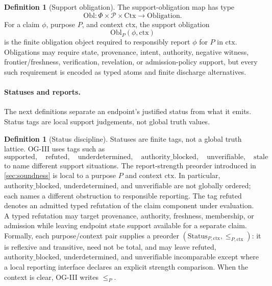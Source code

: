 \documentclass[11pt,twoside]{article}
\theoremstyle{definition}
\newtheorem{definition}[theorem]{Definition}
\newcommand{\Obl}{\mathrm{Obl}}
\newcommand{\Obligation}{\mathrm{Obligation}}
\newcommand{\ctx}{\mathrm{ctx}}
\newcommand{\stale}{\mathrm{stale}}
\newcommand{\supported}{\mathrm{supported}}
\newcommand{\refuted}{\mathrm{refuted}}
\newcommand{\underdetermined}{\mathrm{underdetermined}}
\newcommand{\authorityblocked}{\mathrm{authority\_blocked}}
\newcommand{\unverifiable}{\mathrm{unverifiable}}
\begin{document}
\begin{definition}[Support obligation]
The support-obligation map has type
\[
  \Obl:\Phi\times\mathcal P\times\mathrm{Ctx}\to\Obligation.
\]
For a claim $\phi$, purpose $P$, and context $\ctx$, the support obligation
\[
  \Obl_P(\phi,\ctx)
\]
is the finite obligation object required to responsibly report $\phi$ for $P$
in $\ctx$. Obligations may require state, provenance, intent, authority,
negative witness, frontier/freshness, verification, revelation, or
admission-policy support, but every such requirement is encoded as typed atoms
and finite discharge alternatives.
\end{definition}

\paragraph{Statuses and reports.}
The next definitions separate an endpoint's justified status from what it emits.
Status tags are local support judgements, not global truth values.

\begin{definition}[Status discipline]
Statuses are finite tags, not a global truth lattice. OG-III uses tags such as
\[
  \supported,\quad \refuted,\quad \underdetermined,\quad \authorityblocked,\quad \unverifiable,\quad \stale
\]
to name different support situations. The report-strength preorder introduced in
\cref{sec:soundness} is local to a purpose $P$ and context $\ctx$. In
particular, $\authorityblocked$, $\underdetermined$, and $\unverifiable$ are not
globally ordered; each names a different obstruction to responsible reporting.
The tag $\refuted$ denotes an admitted typed refutation of the claim component
under evaluation. A typed refutation may target provenance, authority,
freshness, membership, or admission while leaving endpoint state support
available for a separate claim. Formally, each purpose/context pair supplies a
preorder $(\mathrm{Status}_{P,\ctx},\leq_{P,\ctx})$: it is reflexive and
transitive, need not be total, and may leave $\refuted$, $\authorityblocked$,
$\underdetermined$, and $\unverifiable$ incomparable except where a local
reporting interface declares an explicit strength comparison. When the context
is clear, OG-III writes $\leq_P$.
\end{definition}
\end{document}
